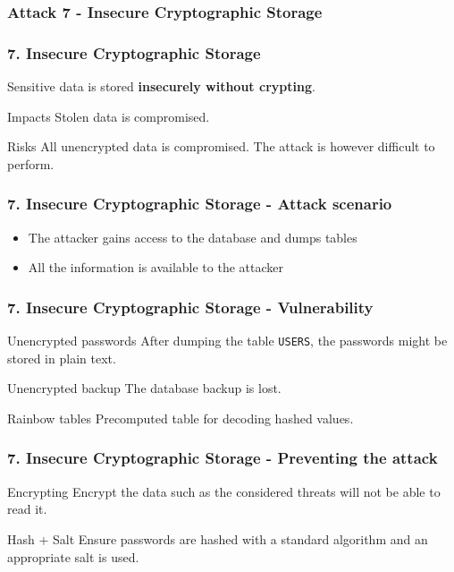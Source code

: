 \subsubsection{Attack 7 - Insecure Cryptographic Storage}

\begin{frame}
\frametitle{7. Insecure Cryptographic Storage}
Sensitive data is stored \textbf{insecurely without crypting}.
\begin{block}{Impacts}
Stolen data is compromised.
\end{block}
\begin{block}{Risks}
All unencrypted \alert{data} is compromised.
The attack is however difficult to perform.
\end{block}
\end{frame}

\begin{frame}
\frametitle{7. Insecure Cryptographic Storage - Attack scenario}
\begin{itemize}
\item The attacker gains access to the database and dumps tables
\item All the information is available to the attacker
\end{itemize}
\end{frame}

\begin{frame}
\frametitle{7. Insecure Cryptographic Storage - Vulnerability}
\begin{exampleblock}{Unencrypted passwords}
After dumping the table \texttt{USERS}, the passwords might be stored in
plain text.
\end{exampleblock}
\begin{exampleblock}{Unencrypted backup}
The database backup is lost.
\end{exampleblock}
\begin{exampleblock}{Rainbow tables}
Precomputed table for decoding hashed values.
\end{exampleblock}
\end{frame}

\begin{frame}
\frametitle{7. Insecure Cryptographic Storage - Preventing the attack}
\begin{block}{Encrypting}
Encrypt the data such as the considered threats will not be able to read it.
\end{block}
\begin{block}{Hash + Salt}
Ensure passwords are hashed with a standard algorithm and an appropriate salt
is used.
\end{block}
\end{frame}

